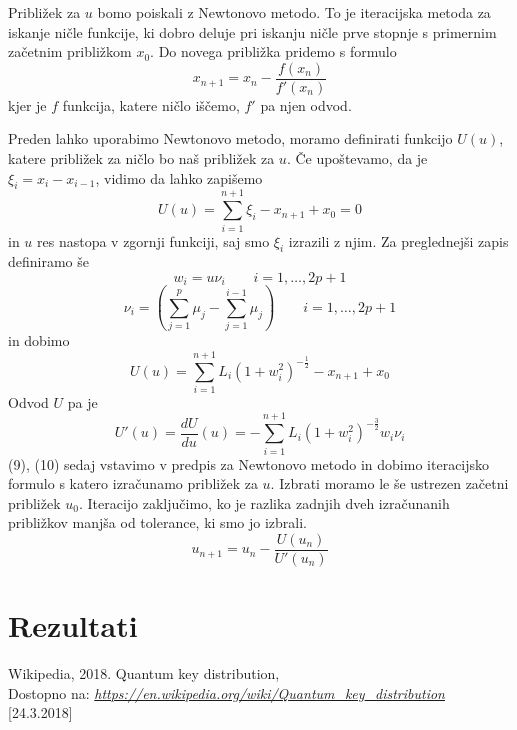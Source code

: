 \documentclass[A4paper, 11pt]{article}
\begin{document}
Približek za $u$ bomo poiskali z Newtonovo metodo. To je iteracijska metoda za iskanje ničle funkcije, ki dobro deluje pri iskanju ničle prve stopnje s primernim začetnim približkom $x_0$. Do novega približka pridemo s formulo
\[ x_{n+1} = x_n - \frac{f(x_n)}{f'(x_n)} \]
kjer je $f$ funkcija, katere ničlo iščemo, $f'$ pa njen odvod. 

Preden lahko uporabimo Newtonovo metodo, moramo definirati funkcijo $U(u)$, katere približek za ničlo bo naš približek za $u$.
Če upoštevamo, da je $\xi_i = x_i - x_{i-1}$, vidimo da lahko zapišemo
\[ U(u) = \sum_{i=1}^{n+1} \xi_i - x_{n+1} + x_0 = 0 \]
in $u$ res nastopa v zgornji funkciji, saj smo $\xi_i$ izrazili z njim. Za preglednejši zapis definiramo še 
\[ w_i = u \nu_i \qquad i=1, \ldots, 2p+1\]
\[ \nu_i = \left ( \sum_{j=1}^{p} \mu_j - \sum_{j=1}^{i-1} \mu_j \right ) \qquad i=1, \ldots, 2p+1\]
in dobimo
\begin{equation}
U(u) =  \sum_{i=1}^{n+1} L_i (1 + w_i ^2) ^ {-\frac{1}{2}} - x_{n+1} + x_0
\end{equation}
Odvod $U$ pa je
\begin{equation}
U'(u) = \frac{dU}{du} (u) = - \sum_{i=1}^{n+1} L_i (1 + w_i ^2) ^ {-\frac{3}{2}} w_i \nu_i 
\end{equation}
(9), (10) sedaj vstavimo v predpis za Newtonovo metodo in dobimo iteracijsko formulo s katero izračunamo približek za $u$. Izbrati moramo le še ustrezen začetni približek $u_0$. Iteracijo zaključimo, ko je razlika zadnjih dveh izračunanih približkov manjša od tolerance, ki smo jo izbrali.
\begin{equation}
u_{n+1} = u_n - \frac{U(u_n)}{U'(u_n)}
\end{equation}


\section{Rezultati} 




\begin{thebibliography}{9}
	Wikipedia, 2018. Quantum key distribution,  \\
	Dostopno na:
	\textit{\url{https://en.wikipedia.org/wiki/Quantum_key_distribution}}
	[24.3.2018]
\end{thebibliography}
\end{document}
